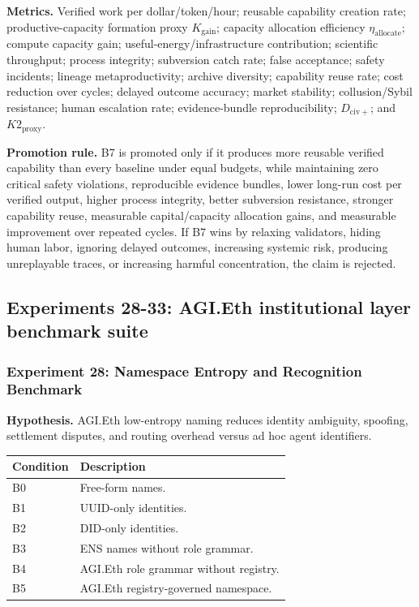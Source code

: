 \textbf{Metrics.} Verified work per dollar/token/hour; reusable
capability creation rate; productive-capacity formation proxy
\(K_{\mathrm{gain}}\); capacity allocation efficiency
\(\eta_{\mathrm{allocate}}\); compute capacity gain;
useful-energy/infrastructure contribution; scientific throughput;
process integrity; subversion catch rate; false acceptance; safety
incidents; lineage metaproductivity; archive diversity; capability reuse
rate; cost reduction over cycles; delayed outcome accuracy; market
stability; collusion/Sybil resistance; human escalation rate;
evidence-bundle reproducibility; \(D_{\mathrm{civ}+}\); and
\(K2_{\mathrm{proxy}}\).

\textbf{Promotion rule.} B7 is promoted only if it produces more
reusable verified capability than every baseline under equal budgets,
while maintaining zero critical safety violations, reproducible evidence
bundles, lower long-run cost per verified output, higher process
integrity, better subversion resistance, stronger capability reuse,
measurable capital/capacity allocation gains, and measurable improvement
over repeated cycles. If B7 wins by relaxing validators, hiding human
labor, ignoring delayed outcomes, increasing systemic risk, producing
unreplayable traces, or increasing harmful concentration, the claim is
rejected.

\subsection{Experiments 28-33: AGI.Eth institutional layer benchmark
suite}\label{experiments-28-33-agi.eth-institutional-layer-benchmark-suite}

\subsubsection{Experiment 28: Namespace Entropy and Recognition
Benchmark}\label{experiment-28-namespace-entropy-and-recognition-benchmark}

\textbf{Hypothesis.} AGI.Eth low-entropy naming reduces identity
ambiguity, spoofing, settlement disputes, and routing overhead versus ad
hoc agent identifiers.

\begin{longtable}[]{@{}ll@{}}
\toprule\noalign{}
Condition & Description \\
\midrule\noalign{}
\endhead
\bottomrule\noalign{}
\endlastfoot
B0 & Free-form names. \\
B1 & UUID-only identities. \\
B2 & DID-only identities. \\
B3 & ENS names without role grammar. \\
B4 & AGI.Eth role grammar without registry. \\
B5 & AGI.Eth registry-governed namespace. \\
\end{longtable}

